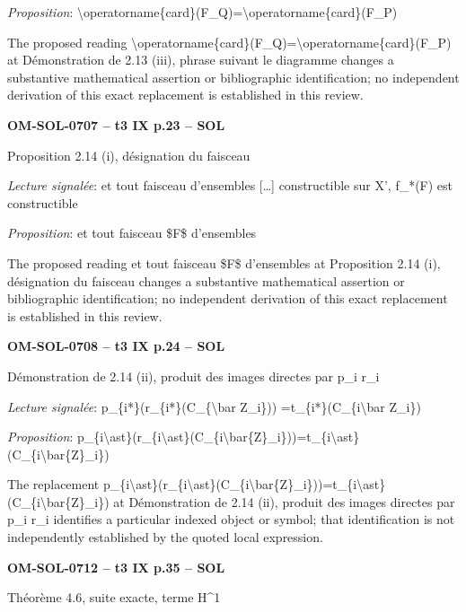 \emph{Proposition}: \textbackslash{}operatorname\{card\}(F\_Q)=\allowbreak \textbackslash{}operatorname\{card\}(F\_P)\par
The proposed reading \textbackslash{}operatorname\{card\}(F\_Q)=\allowbreak \textbackslash{}operatorname\{card\}(F\_P) at Démonstration de 2.13 (iii), phrase suivant le diagramme changes a substantive mathematical assertion or bibliographic identification; no independent derivation of this exact replacement is established in this review.\par
\par\noindent\textbf{OM-SOL-0707 -- t3 IX p.23 -- SOL}\par
Proposition 2.14 (i), désignation du faisceau\par
\emph{Lecture signalée}: et tout faisceau d'ensembles […] constructible sur X', f\_*(F) est constructible\par
\emph{Proposition}: et tout faisceau \$F\$ d'ensembles\par
The proposed reading et tout faisceau \$F\$ d'ensembles at Proposition 2.14 (i), désignation du faisceau changes a substantive mathematical assertion or bibliographic identification; no independent derivation of this exact replacement is established in this review.\par
\par\noindent\textbf{OM-SOL-0708 -- t3 IX p.24 -- SOL}\par
Démonstration de 2.14 (ii), produit des images directes par p\_i r\_i\par
\emph{Lecture signalée}: p\_\{i*\}(r\_\{i*\}(C\_\{\textbackslash{}bar Z\_i\})) =\allowbreak  t\_\{i*\}(C\_\{i\textbackslash{}bar Z\_i\})\par
\emph{Proposition}: p\_\{i\textbackslash{}ast\}(r\_\{i\textbackslash{}ast\}(C\_\{i\textbackslash{}bar\{Z\}\_i\}))=\allowbreak t\_\{i\textbackslash{}ast\}(C\_\{i\textbackslash{}bar\{Z\}\_i\})\par
The replacement p\_\{i\textbackslash{}ast\}(r\_\{i\textbackslash{}ast\}(C\_\{i\textbackslash{}bar\{Z\}\_i\}))=\allowbreak t\_\{i\textbackslash{}ast\}(C\_\{i\textbackslash{}bar\{Z\}\_i\}) at Démonstration de 2.14 (ii), produit des images directes par p\_i r\_i identifies a particular indexed object or symbol; that identification is not independently established by the quoted local expression.\par
\par\noindent\textbf{OM-SOL-0712 -- t3 IX p.35 -- SOL}\par
Théorème 4.6, suite exacte, terme H\textasciicircum{}1\par
